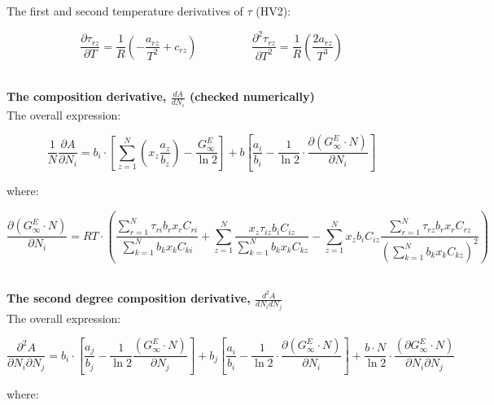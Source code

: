 \documentclass[a4paper, 12pt, english, sintefheadings, sintefcolour]{sintefmemo}
\begin{document}
The first and second temperature derivatives of $\tau$ (HV2):

\begin{equation}
\frac{\partial \tau_{rz}}{\partial T}=\frac{1}{R}\left(-\frac{a_{rz}}{T^2}+c_{rz}\right)\hspace{2cm}\frac{\partial^2 \tau_{rz}}{\partial T^2}=\frac{1}{R}\left(\frac{2a_{rz}}{T^3}\right)
\end{equation}

\noindent\hrulefill\\

\textbf{The composition derivative, $\frac{dA}{dN_i}$ (checked numerically)}\\
The overall expression:

\begin{equation}
\frac{1}{N}\frac{\partial A}{\partial N_i}=b_i\cdot \left[\sum_{z=1}^N\left(x_z\frac{a_z}{b_z}\right)-\frac{G_{\infty}^E}{\ln{2}}\right]+b\left[\frac{a_i}{b_i}-\frac{1}{\ln{2}}\cdot\frac{\partial \left(G_{\infty}^E\cdot N\right)}{\partial N_i}\right]
\end{equation}

where:

\begin{equation}
\frac{\partial \left(G_{\infty}^E\cdot N\right)}{\partial N_i}=RT\cdot\left(\frac{\sum_{r=1}^N\tau_{ri}b_rx_rC_{ri}}{\sum_{k=1}^N b_kx_kC_{ki}}
+\sum_{z=1}^N\frac{x_z\tau_{iz}b_iC_{iz}}{\sum_{k=1}^N b_kx_kC_{kz}}- \sum_{z=1}^N x_zb_iC_{iz}\frac{\sum_{r=1}^N\tau_{rz}b_rx_rC_{rz}}{\left(\sum_{k=1}^N b_kx_kC_{kz}\right)^2}\right) 
\end{equation}

\noindent\hrulefill\\

\textbf{The second degree composition derivative, $\frac{d^2A}{dN_idN_j}$}\\
The overall expression:

\begin{equation}
\frac{\partial^2 A}{\partial N_i \partial N_j}=b_i\cdot \left[\frac{a_j}{b_j}-\frac{1}{\ln{2}}\frac{\left(G_{\infty}^E\cdot N\right)}{\partial N_j}\right]
+b_j\left[ \frac{a_i}{b_i}-\frac{1}{\ln{2}}\cdot\frac{\partial \left( G_{\infty}^E\cdot N\right)}{\partial N_i}\right]+\frac{b\cdot N}{\ln{2}}\cdot \frac{\left(\partial G_{\infty}^E\cdot N\right)}{\partial N_i \partial N_j}
\end{equation}

where:
\end{document}
